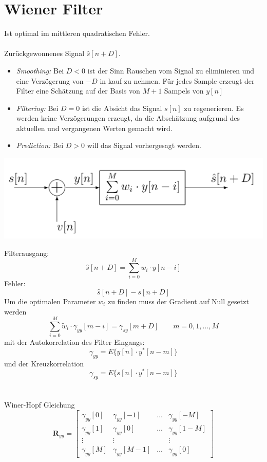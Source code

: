 \section{Wiener Filter}
Ist optimal im mittleren quadratischen Fehler.\\
\\
Zurückgewonnenes Signal $\hat{s}[n+D]$.
\begin{itemize}
	\item \textit{Smoothing:} Bei $D<0$ ist der Sinn Rauschen vom Signal zu
	eliminieren und eine Verzögerung von $-D$ in kauf zu nehmen. Für jedes Sample
	erzeugt der Filter eine Schätzung auf der Basis von $M+1$ Sampels von $y[n]$
	\item \textit{Filtering:} Bei $D=0$ ist die Absicht das Signal $s[n]$ zu regenerieren.
	Es werden keine Verzögerungen erzeugt, da die Abschätzung aufgrund des 
	aktuellen und vergangenen Werten gemacht wird.
	\item \textit{Prediction:} Bei $D>0$ will das Signal vorhergesagt werden.
\end{itemize} 
\begin{center}
	\includegraphics[scale=.7]{./images/wiener_filter}
\end{center}
Filterausgang:
\[ \hat{s}[n+D] = \sum_{i=0}^{M}w_i\cdot y[n-i] \]
Fehler:
\[ \hat{s}[n+D] - s[n+D] \]
Um die optimalen Parameter $w_i$ zu finden muss der Gradient auf Null gesetzt 
werden
\[ \sum_{i=0}^{M}\tilde{w}_i \cdot \gamma_{yy}[m-i] = \gamma_{sy}[m+D] \qquad
	m=0,1,...,M \]
mit der Autokorrelation des Filter Eingangs:
\[ \gamma_{yy} = E\{ y[n] \cdot y^*[n-m] \} \]
und der Kreuzkorrelation
\[ \gamma_{sy} = E \{ s[n] \cdot y^*[n-m] \} \]
~\\
\\
Winer-Hopf Gleichung
\[ \textbf{R}_{yy} = \begin{bmatrix}
	\gamma_{yy}[0]	& \gamma_{yy}[-1]	& \ldots	& \gamma_{yy}[-M]\\
	\gamma_{yy}[1]	& \gamma_{yy}[0]	& \ldots	& \gamma_{yy}[1-M]\\
	\vdots			& \vdots			&			& \vdots\\
	\gamma_{yy}[M]	& \gamma_{yy}[M-1]	& \ldots	& \gamma_{yy}[0]
\end{bmatrix}\]
